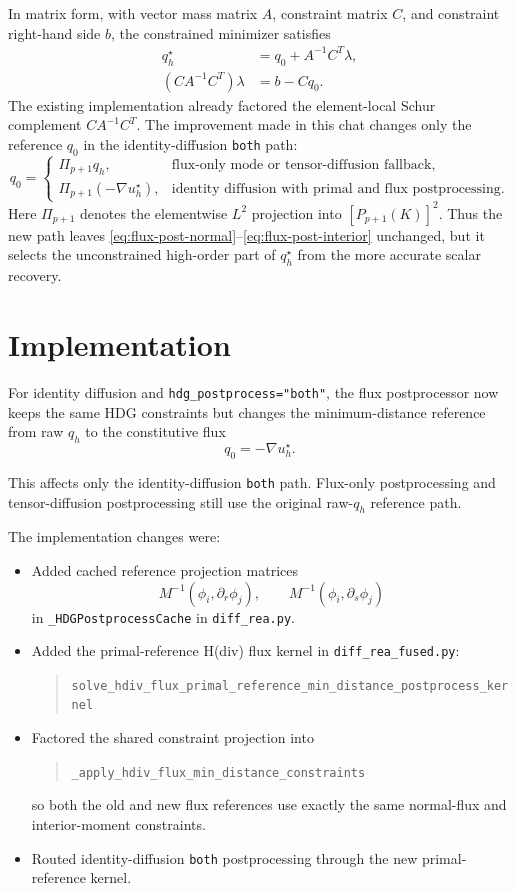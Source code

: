 \documentclass[11pt]{article}
\begin{document}
In matrix form, with vector mass matrix $A$, constraint matrix $C$, and
constraint right-hand side $b$, the constrained minimizer satisfies
\begin{align}
q_h^\star &= q_0 + A^{-1} C^T \lambda, \\
(C A^{-1} C^T)\lambda &= b - C q_0.
\end{align}
The existing implementation already factored the element-local Schur
complement $C A^{-1} C^T$. The improvement made in this chat changes only
the reference $q_0$ in the identity-diffusion \verb|both| path:
\[
q_0 =
\begin{cases}
\Pi_{p+1} q_h,
    & \text{flux-only mode or tensor-diffusion fallback}, \\
\Pi_{p+1}(-\nabla u_h^\star),
    & \text{identity diffusion with primal and flux postprocessing}.
\end{cases}
\]
Here $\Pi_{p+1}$ denotes the elementwise $L^2$ projection into
$[P_{p+1}(K)]^2$. Thus the new path leaves
\eqref{eq:flux-post-normal}--\eqref{eq:flux-post-interior} unchanged, but it
selects the unconstrained high-order part of $q_h^\star$ from the more
accurate scalar recovery.

\section{Implementation}

For identity diffusion and \verb|hdg_postprocess="both"|, the flux
postprocessor now keeps the same HDG constraints but changes the
minimum-distance reference from raw $q_h$ to the constitutive flux
\[
q_0 = -\nabla u_h^\star.
\]

This affects only the identity-diffusion \verb|both| path. Flux-only
postprocessing and tensor-diffusion postprocessing still use the original
raw-$q_h$ reference path.

The implementation changes were:
\begin{itemize}
    \item Added cached reference projection matrices
    \[
    M^{-1}(\phi_i, \partial_r \phi_j), \qquad
    M^{-1}(\phi_i, \partial_s \phi_j)
    \]
    in \verb|_HDGPostprocessCache| in \verb|diff_rea.py|.
    \item Added the primal-reference H(div) flux kernel in
    \verb|diff_rea_fused.py|:
    \begin{quote}
    \small
    \verb|solve_hdiv_flux_primal_reference_min_distance_postprocess_kernel|
    \end{quote}
    \item Factored the shared constraint projection into
    \begin{quote}
    \small
    \verb|_apply_hdiv_flux_min_distance_constraints|
    \end{quote}
    so both the old and new
    flux references use exactly the same normal-flux and interior-moment
    constraints.
    \item Routed identity-diffusion \verb|both| postprocessing through the new
    primal-reference kernel.
\end{itemize}
\end{document}
